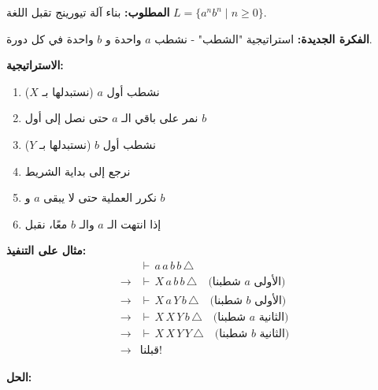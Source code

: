 \documentclass[14pt]{extarticle}
\begin{document}
\textbf{المطلوب:} بناء آلة تيورينج تقبل اللغة $L = \{a^n b^n \mid n \geq 0\}$.

\textbf{الفكرة الجديدة:} استراتيجية "الشطب" - نشطب $a$ واحدة و $b$ واحدة في كل دورة.

\textbf{الاستراتيجية:}
\begin{enumerate}
    \item نشطب أول $a$ (نستبدلها بـ $X$)
    \item نمر على باقي الـ $a$ حتى نصل إلى أول $b$
    \item نشطب أول $b$ (نستبدلها بـ $Y$)
    \item نرجع إلى بداية الشريط
    \item نكرر العملية حتى لا يبقى $a$ و $b$
    \item إذا انتهت الـ $a$ والـ $b$ معًا، نقبل
\end{enumerate}

\textbf{مثال على التنفيذ:}
\begin{align*}
&\vdash \, a \, a \, b \, b \, \triangle \\
\to &\vdash \, X \, a \, b \, b \, \triangle \quad \text{(شطبنا $a$ الأولى)} \\
\to &\vdash \, X \, a \, Y \, b \, \triangle \quad \text{(شطبنا $b$ الأولى)} \\
\to &\vdash \, X \, X \, Y \, b \, \triangle \quad \text{(شطبنا $a$ الثانية)} \\
\to &\vdash \, X \, X \, Y \, Y \, \triangle \quad \text{(شطبنا $b$ الثانية)} \\
\to &\text{قبلنا!}
\end{align*}

\textbf{الحل:}

\begin{center}
\end{center}
\end{document}
